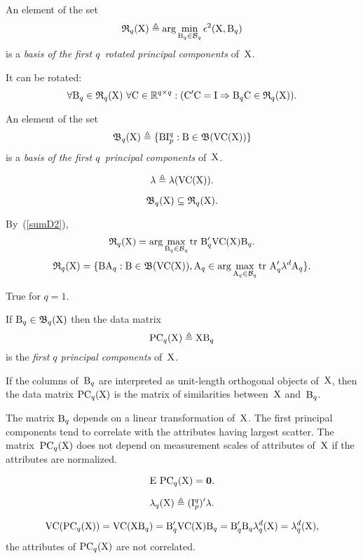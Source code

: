 \documentclass[10pt,a4paper]{article}
\theoremstyle{plain} \newtheorem{Lem}{Lemma}
\begin{document}
An element of the set 
$$ \mathfrak R_q(\mathrm X) \triangleq \arg \min_{\mathrm B_q \in \mathcal B_q} \epsilon^2(\mathrm X, \mathrm B_q) $$
is a {\em basis of the first $q$~rotated principal components} of~$\mathrm X$.

It can be rotated:
$$ \forall \mathrm B_q \in \mathfrak R_q(\mathrm X) \ \forall \mathrm C \in \mathbb R^{q \times q}: 
  (\mathrm C' \mathrm C = \mathrm I \Rightarrow \mathrm B_q \mathrm C \in \mathfrak R_q(\mathrm X)). 
$$

An element of the set 
$$ \mathfrak B_q(\mathrm X) \triangleq \{\mathrm B \mathrm I^q_p : \mathrm B \in \mathfrak B(\mathrm {VC}(\mathrm X)) \} $$
is a {\em basis of the first $q$~principal components} of~$\mathrm X$.

$$ \mathbf \lambda \triangleq \lambda(\mathrm {VC}(\mathrm X)). $$

$$ \mathfrak B_q(\mathrm X) \subseteq \mathfrak R_q(\mathrm X). $$
\proof
{
By~(\ref{sumD2}),
$$ \mathfrak R_q(\mathrm X) = \arg \max_{\mathrm B_q \in \mathcal B_q} \mathrm {tr} \  \mathrm B_q' \mathrm {VC} (\mathrm X) \mathrm B_q. $$
$$ \mathfrak R_q(\mathrm X) = 
  \{ \mathrm B \mathrm A_q : \mathrm B \in \mathfrak B(\mathrm {VC}(\mathrm X)), 
                       \mathrm A_q \in \arg \max_{\mathrm A_q \in \mathcal B_q} \mathrm {tr} \  \mathrm A_q' \mathbf \lambda^d \mathrm A_q 
  \}.
$$


True for $q = 1$.
}

If $\mathrm B_q \in \mathfrak B_q(\mathrm X)$ then the data matrix
$$\mathrm {PC}_q(\mathrm X) \triangleq \mathrm X \mathrm B_q$$
is the {\em first $q$ principal components} of~$\mathrm X$.

If the columns of~$\mathrm B_q$ are interpreted as unit-length orthogonal objects of~$\mathrm X$,
then the data matrix $\mathrm {PC}_q(\mathrm X)$ is the matrix of similarities between~$\mathrm X$ and~$\mathrm B_q$.

The matrix $\mathrm B_q$ depends on a linear transformation of~$\mathrm X$. 
The first principal components tend to correlate with the attributes having largest scatter.
The matrix~$\mathrm {PC}_q(\mathrm X)$ does not depend on measurement scales of attributes of~$\mathrm X$ if the attributes are normalized.

$$ \mathrm E \  \mathrm {PC}_q(\mathrm X) = \mathbf 0. $$

$$ \mathbf \lambda_q(\mathrm X) \triangleq (\mathrm I^q_p)' \mathbf \lambda. $$

$$ \mathrm {VC} (\mathrm {PC}_q(\mathrm X)) = \mathrm {VC} (\mathrm X \mathrm B_q)
                = \mathrm B_q' \mathrm {VC} (\mathrm X) \mathrm B_q
                = \mathrm B_q' \mathrm B_q \mathbf \lambda_q^d(\mathrm X) 
                = \mathbf \lambda_q^d(\mathrm X),
$$
the attributes of $\mathrm {PC}_q(\mathrm X)$ are not correlated.
\end{document}
